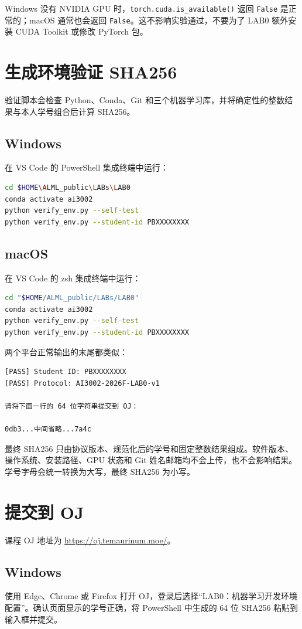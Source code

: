 \documentclass[11pt,a4paper]{article}
\newcommand{\windows}{\subsection*{\textcolor{windowsblue}{Windows}}}
\newcommand{\macos}{\subsection*{\textcolor{macgray}{macOS}}}
\begin{document}
Windows 没有 NVIDIA GPU 时，\texttt{torch.cuda.is\_available()} 返回 \texttt{False} 是正常的；macOS 通常也会返回 \texttt{False}。这不影响实验通过，不要为了 LAB0 额外安装 CUDA Toolkit 或修改 PyTorch 包。

\section{生成环境验证 SHA256}

验证脚本会检查 Python、Conda、Git 和三个机器学习库，并将确定性的整数结果与本人学号组合后计算 SHA256。

\windows

在 VS Code 的 PowerShell 集成终端中运行：

\begin{lstlisting}[language=bash]
cd $HOME\ALML_public\LABs\LAB0
conda activate ai3002
python verify_env.py --self-test
python verify_env.py --student-id PBXXXXXXXX
\end{lstlisting}

\macos

在 VS Code 的 zsh 集成终端中运行：

\begin{lstlisting}[language=bash]
cd "$HOME/ALML_public/LABs/LAB0"
conda activate ai3002
python verify_env.py --self-test
python verify_env.py --student-id PBXXXXXXXX
\end{lstlisting}

两个平台正常输出的末尾都类似：

\begin{lstlisting}
[PASS] Student ID: PBXXXXXXXX
[PASS] Protocol: AI3002-2026F-LAB0-v1

请将下面一行的 64 位字符串提交到 OJ：

0db3...中间省略...7a4c
\end{lstlisting}

最终 SHA256 只由协议版本、规范化后的学号和固定整数结果组成。软件版本、操作系统、安装路径、GPU 状态和 Git 姓名邮箱均不会上传，也不会影响结果。学号字母会统一转换为大写，最终 SHA256 为小写。

\section{提交到 OJ}

课程 OJ 地址为 \url{https://oj.temaurinum.moe/}。

\windows

使用 Edge、Chrome 或 Firefox 打开 OJ，登录后选择“LAB0：机器学习开发环境配置”。确认页面显示的学号正确，将 PowerShell 中生成的 64 位 SHA256 粘贴到输入框并提交。
\end{document}
